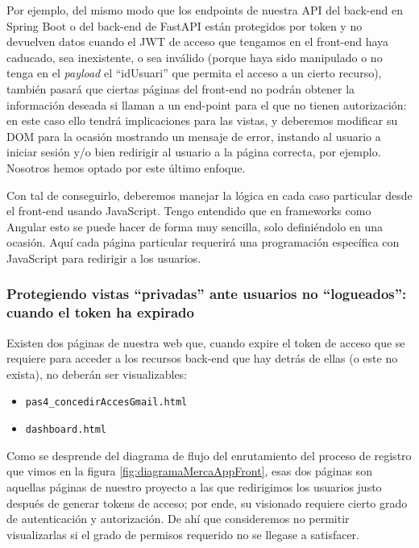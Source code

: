 \documentclass[a4paper,12pt]{report}
\begin{document}
	Por ejemplo, del mismo modo que los endpoints de nuestra API del back-end en Spring Boot o del back-end de FastAPI están protegidos por token y no devuelven datos cuando el JWT de acceso que tengamos en el front-end haya caducado, sea inexistente, o sea inválido (porque haya sido manipulado o no tenga en el \textit{payload} el ``idUsuari'' que permita el acceso a un cierto recurso), también pasará que ciertas páginas del front-end no podrán obtener la información deseada si llaman a un end-point para el que no tienen autorización: en este caso ello tendrá implicaciones para las vistas, y deberemos modificar su DOM para la ocasión mostrando un mensaje de error, instando al usuario a iniciar sesión y/o bien redirigir al usuario a la página correcta, por ejemplo. Nosotros hemos optado por este último enfoque.
	
	Con tal de conseguirlo, deberemos manejar la lógica en cada caso particular desde el front-end usando JavaScript. Tengo entendido que en frameworks como Angular esto se puede hacer de forma muy sencilla, solo definiéndolo en una ocasión. Aquí cada página particular requerirá una programación específica con JavaScript para redirigir a los usuarios.
	
	\subsubsection{Protegiendo vistas ``privadas'' ante usuarios no ``logueados'': cuando el token ha expirado}
	
	Existen dos páginas de nuestra web que, cuando expire el token de acceso que se requiere para acceder a los recursos back-end que hay detrás de ellas (o este no exista), no deberán ser visualizables:
	
	\vspace{0em}
	\begin{itemize}
		\setlength{\itemsep}{-.5em}
		\item \texttt{pas4\_concedirAccesGmail.html}
		\item \texttt{dashboard.html}
	\end{itemize}
	
	Como se desprende del diagrama de flujo del enrutamiento del proceso de registro que vimos en la figura \ref{fig:diagramaMercaAppFront}, esas dos páginas son aquellas páginas de nuestro proyecto a las que redirigimos los usuarios justo después de generar tokens de acceso; por ende, su visionado requiere cierto grado de autenticación y autorización. De ahí que consideremos no permitir visualizarlas si el grado de permisos requerido no se llegase a satisfacer.
	
\end{document}
